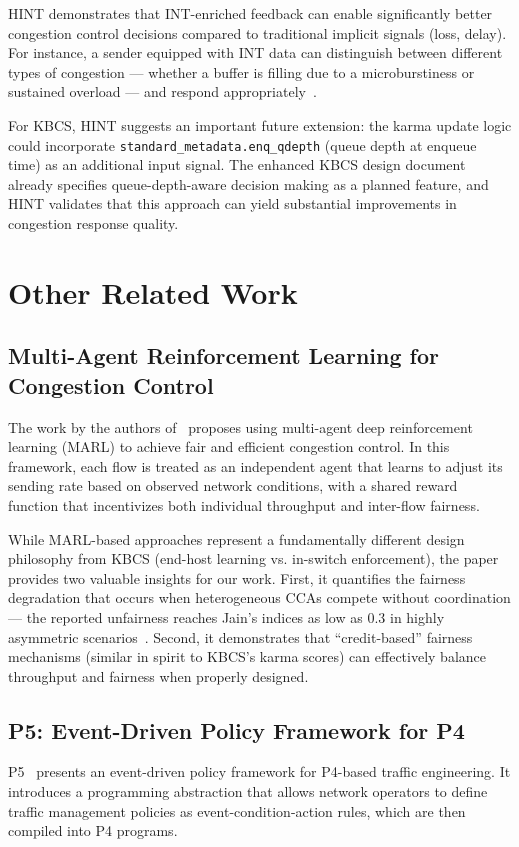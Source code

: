 \documentclass[12pt,a4paper]{report}
\begin{document}
HINT demonstrates that INT-enriched feedback can enable significantly better congestion control decisions compared to traditional implicit signals (loss, delay). For instance, a sender equipped with INT data can distinguish between different types of congestion — whether a buffer is filling due to a microburstiness or sustained overload — and respond appropriately~\cite{hint}.

For KBCS, HINT suggests an important future extension: the karma update logic could incorporate \texttt{standard\_metadata.enq\_qdepth} (queue depth at enqueue time) as an additional input signal. The enhanced KBCS design document already specifies queue-depth-aware decision making as a planned feature, and HINT validates that this approach can yield substantial improvements in congestion response quality.

\section{Other Related Work}

\subsection{Multi-Agent Reinforcement Learning for Congestion Control}
The work by the authors of~\cite{marlcc} proposes using multi-agent deep reinforcement learning (MARL) to achieve fair and efficient congestion control. In this framework, each flow is treated as an independent agent that learns to adjust its sending rate based on observed network conditions, with a shared reward function that incentivizes both individual throughput and inter-flow fairness.

While MARL-based approaches represent a fundamentally different design philosophy from KBCS (end-host learning vs. in-switch enforcement), the paper provides two valuable insights for our work. First, it quantifies the fairness degradation that occurs when heterogeneous CCAs compete without coordination — the reported unfairness reaches Jain's indices as low as $0.3$ in highly asymmetric scenarios~\cite{marlcc}. Second, it demonstrates that ``credit-based'' fairness mechanisms (similar in spirit to KBCS's karma scores) can effectively balance throughput and fairness when properly designed.

\subsection{P5: Event-Driven Policy Framework for P4}
P5~\cite{p5} presents an event-driven policy framework for P4-based traffic engineering. It introduces a programming abstraction that allows network operators to define traffic management policies as event-condition-action rules, which are then compiled into P4 programs.
\end{document}
